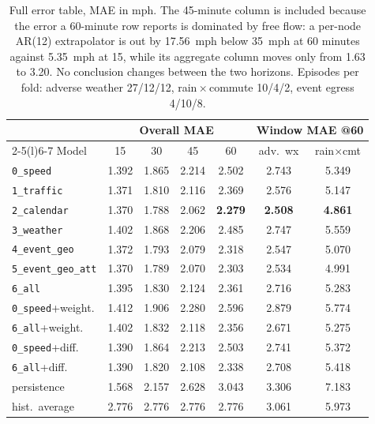 \documentclass[letterpaper]{article}
\begin{document}
\begin{table}[t]
\centering
\scriptsize
\setlength{\tabcolsep}{2.6pt}
\begin{tabular}{@{}lcccccc@{}}
\toprule
 & \multicolumn{4}{c}{Overall MAE} & \multicolumn{2}{c}{Window MAE @60} \\
\cmidrule(lr){2-5}\cmidrule(l){6-7}
Model & 15 & 30 & 45 & 60 & adv.\ wx & rain$\times$cmt \\
\midrule
\texttt{0\_speed}             & 1.392 & 1.865 & 2.214 & 2.502 & 2.743 & 5.349 \\
\texttt{1\_traffic}           & 1.371 & 1.810 & 2.116 & 2.369 & 2.576 & 5.147 \\
\texttt{2\_calendar}          & 1.370 & 1.788 & 2.062 & \textbf{2.279} & \textbf{2.508} & \textbf{4.861} \\
\texttt{3\_weather}           & 1.402 & 1.868 & 2.206 & 2.485 & 2.747 & 5.559 \\
\texttt{4\_event\_geo}        & 1.372 & 1.793 & 2.079 & 2.318 & 2.547 & 5.070 \\
\texttt{5\_event\_geo\_att}   & 1.370 & 1.789 & 2.070 & 2.303 & 2.534 & 4.991 \\
\texttt{6\_all}               & 1.395 & 1.830 & 2.124 & 2.361 & 2.716 & 5.283 \\
\addlinespace
\texttt{0\_speed}+weight.     & 1.412 & 1.906 & 2.280 & 2.596 & 2.879 & 5.774 \\
\texttt{6\_all}+weight.       & 1.402 & 1.832 & 2.118 & 2.356 & 2.671 & 5.275 \\
\texttt{0\_speed}+diff.       & 1.390 & 1.864 & 2.213 & 2.503 & 2.741 & 5.372 \\
\texttt{6\_all}+diff.         & 1.390 & 1.820 & 2.108 & 2.338 & 2.708 & 5.418 \\
\addlinespace
persistence                   & 1.568 & 2.157 & 2.628 & 3.043 & 3.306 & 7.183 \\
hist.\ average                & 2.776 & 2.776 & 2.776 & 2.776 & 3.061 & 5.973 \\
\bottomrule
\end{tabular}
\caption{Full error table, MAE in mph. The 45-minute column is included because the error a 60-minute row reports is dominated by free flow: a per-node AR(12) extrapolator is out by 17.56~mph below 35~mph at 60 minutes against 5.35~mph at 15, while its aggregate column moves only from 1.63 to 3.20. No conclusion changes between the two horizons. Episodes per fold: adverse weather 27/12/12, rain\,$\times$\,commute 10/4/2, event egress 4/10/8.}
\label{tab:full}
\end{table}
\end{document}

